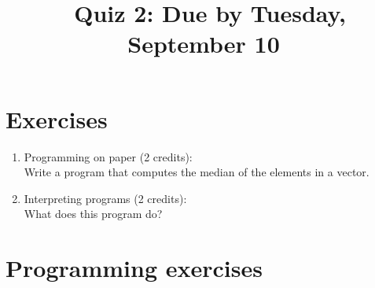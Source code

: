 \documentclass[11pt]{article}
\begin{document}
\title{\coursename~Quiz 2: Due by Tuesday, September 10}
\date{}
\maketitle

\medskip


\section*{Exercises}

\begin{enumerate}
\item Programming on paper (2 credits): \\
Write a program that computes the median of the elements in a vector.

\item Interpreting programs (2 credits): \\
What does this program do?



\end{enumerate}

\section*{Programming exercises}
\end{document}
